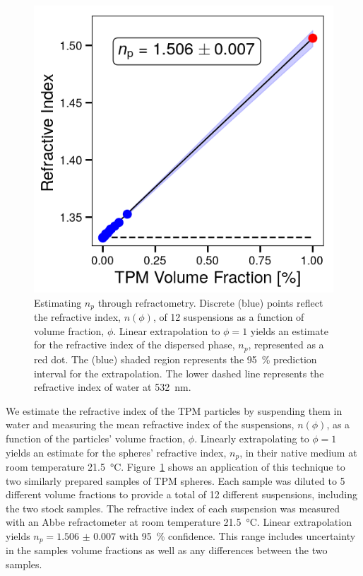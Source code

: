 \documentclass[journal=langd5,manuscript=article,layout=twocolumn]{achemso}
\begin{document}
\begin{figure}[!t]
    \centering
    \includegraphics[width=0.9\columnwidth]{abbe}
    \caption{Estimating $n_p$ through refractometry.
    Discrete (blue) points reflect the refractive index,
    $n(\phi)$, of \num{12} suspensions as a function of volume fraction, $\phi$. Linear extrapolation to $\phi = 1$
    yields an estimate for the refractive index of the dispersed phase, $n_p$, represented as a red dot.
The (blue) shaded region represents the \SI{95}{\percent}
      prediction interval for the extrapolation.
      The lower dashed line represents the refractive index of water at \SI{532}{\nm}.}
    \label{fig:abbe}
\end{figure}

We estimate the refractive index of the TPM particles
by suspending them in water and measuring the mean refractive index of
the suspensions,
$n(\phi)$,
as a function of the particles' volume fraction, $\phi$.
Linearly extrapolating  to $\phi = 1$
yields an estimate for the spheres' refractive index,
$n_p$,
in their native medium at room temperature \SI{21.5}{\celsius}\cite{alexander81}.
Figure~\ref{fig:abbe} shows an application
of this technique to two similarly prepared
samples of TPM spheres.
Each sample was diluted to \num{5} different volume 
fractions to provide a total of \num{12}
different suspensions, including the two stock samples.
The refractive index of each
suspension was measured with an Abbe refractometer
at room temperature \SI{21.5}{\degreeCelsius}.
Linear extrapolation yields
$n_p = \num{1.506(7)}$ with \SI{95}{\percent} confidence.
This range includes uncertainty in the samples
volume fractions as well as any differences between the
two samples.
\end{document}
